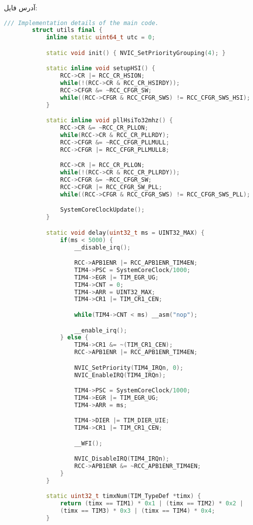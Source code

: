 آدرس فایل:
\hyperref{https://github.com/cardianco/cardian-hardware/blob/master/main/mcu/mcu.h}{}{}{}
\begin{latin}
	\small
	\begin{lstlisting}[language=c++, caption={MCU tool functions}]
		/// Implementation details of the main code.
		struct utils final {
			inline static uint64_t utc = 0;

			static void init() { NVIC_SetPriorityGrouping(4); }

			static inline void setupHSI() {
				RCC->CR |= RCC_CR_HSION;
				while(!(RCC->CR & RCC_CR_HSIRDY));
				RCC->CFGR &= ~RCC_CFGR_SW;
				while((RCC->CFGR & RCC_CFGR_SWS) != RCC_CFGR_SWS_HSI);
			}

			static inline void pllHsiTo32mhz() {
				RCC->CR &= ~RCC_CR_PLLON;
				while(RCC->CR & RCC_CR_PLLRDY);
				RCC->CFGR &= ~RCC_CFGR_PLLMULL;
				RCC->CFGR |= RCC_CFGR_PLLMULL8;

				RCC->CR |= RCC_CR_PLLON;
				while(!(RCC->CR & RCC_CR_PLLRDY));
				RCC->CFGR &= ~RCC_CFGR_SW;
				RCC->CFGR |= RCC_CFGR_SW_PLL;
				while((RCC->CFGR & RCC_CFGR_SWS) != RCC_CFGR_SWS_PLL);

				SystemCoreClockUpdate();
			}

			static void delay(uint32_t ms = UINT32_MAX) {
				if(ms < 5000) {
					__disable_irq();

					RCC->APB1ENR |= RCC_APB1ENR_TIM4EN;
					TIM4->PSC = SystemCoreClock/1000;
					TIM4->EGR |= TIM_EGR_UG;
					TIM4->CNT = 0;
					TIM4->ARR = UINT32_MAX;
					TIM4->CR1 |= TIM_CR1_CEN;

					while(TIM4->CNT < ms) __asm("nop");

					__enable_irq();
				} else {
					TIM4->CR1 &= ~(TIM_CR1_CEN);
					RCC->APB1ENR |= RCC_APB1ENR_TIM4EN;

					NVIC_SetPriority(TIM4_IRQn, 0);
					NVIC_EnableIRQ(TIM4_IRQn);

					TIM4->PSC = SystemCoreClock/1000;
					TIM4->EGR |= TIM_EGR_UG;
					TIM4->ARR = ms;

					TIM4->DIER |= TIM_DIER_UIE;
					TIM4->CR1 |= TIM_CR1_CEN;

					__WFI();

					NVIC_DisableIRQ(TIM4_IRQn);
					RCC->APB1ENR &= ~RCC_APB1ENR_TIM4EN;
				}
			}

			static uint32_t timxNum(TIM_TypeDef *timx) {
				return (timx == TIM1) * 0x1 | (timx == TIM2) * 0x2 |
				(timx == TIM3) * 0x3 | (timx == TIM4) * 0x4;
			}


\end{lstlisting}
\end{latin}
